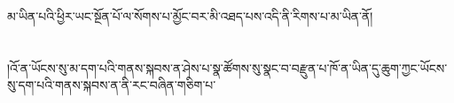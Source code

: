 མ་ཡིན་པའི་ཕྱིར་ཡང་སྔོན་པོ་ལ་སོགས་པ་མྱོང་བར་མི་འཐད་པས་འདི་ནི་རིགས་པ་མ་ཡིན་ནོ།\chapter{ }།འོ་ན་ཡོངས་སུ་མ་དག་པའི་གནས་སྐབས་ན་ཤེས་པ་སྣ་ཚོགས་སུ་སྣང་བ་བརྫུན་པ་ཁོ་ན་ཡིན་དུ་ཆུག་ཀྱང་ཡོངས་སུ་དག་པའི་གནས་སྐབས་ན་ནི་རང་བཞིན་གཅིག་པ་